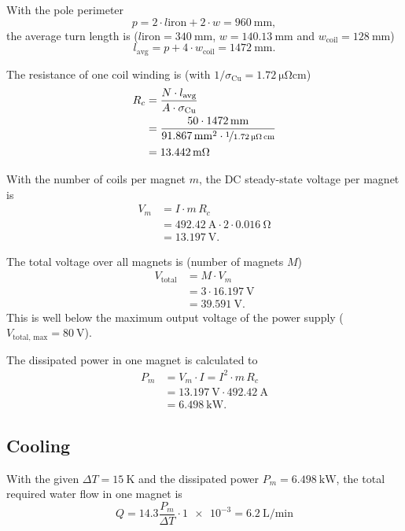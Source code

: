 \documentclass[10pt,a4paper,noendnumber=true]{scrartcl}
\begin{document}
With the pole perimeter
\begin{equation}
	p = 2 \cdot l\text{iron} + 2 \cdot w = \SI{960}{\mm},
\end{equation}
the average turn length is ($l\text{iron} = \SI{340}{\mm}$, $w = \SI{140.13}{\mm}$ and $w_\text{coil} = \SI{128}{\mm}$)
\begin{equation}
    l_\text{avg}= p + 4 \cdot w_\text{coil} = \SI{1472}{\mm}.
\end{equation}

The resistance of one coil winding is (with $1/\sigma_\text{Cu}=\SI{1.72}{\micro\ohm\cm}$)
\begin{align}
R_c&=\frac{N\cdot l_\text{avg}}{A\cdot\sigma_\text{Cu}} \\
&= \frac{50 \cdot \SI{1472}{\mm}}{\SI{91.867}{\mm\squared}\cdot \nicefrac{1}{\SI{1.72}{\micro\ohm\cm}}} \nonumber\\
&= \SI{13.442}{\milli\ohm} \nonumber
\end{align}

With the number of coils per magnet $m$, the DC steady-state voltage per magnet is
\begin{align}
V_m &= I \cdot m\,R_c \\
&= \SI{492.42}{\ampere} \cdot 2 \cdot \SI{0.016}{\ohm} \nonumber\\
&= \SI{13.197}{\volt}.\nonumber
\end{align}

The total voltage over all magnets is (number of magnets $M$)
\begin{align}
V_\text{total} &= M \cdot V_m \\
&= 3 \cdot \SI{16.197}{\volt} \nonumber\\
&= \SI{39.591}{\volt}.\nonumber
\end{align}
This is well below the maximum output voltage of the power supply ($V_\text{total, max}=\SI{80}{\volt}$).

The dissipated power in one magnet is calculated to
\begin{align}
P_m &= V_m \cdot I = I^2 \cdot m\,R_c \\
&= \SI{13.197}{\volt} \cdot \SI{492.42}{\ampere} \nonumber\\
&= \SI{6.498}{\kilo\watt}.\nonumber
\end{align}

\subsection{Cooling}
With the given $\Delta T=\SI{15}{\kelvin}$ and the dissipated power $P_m=\SI{6.498}{\kilo\watt}$, the total required water flow in one magnet is
\begin{equation}
    Q = 14.3 \frac{P_m}{\Delta T} \cdot \num{1e-3} = \SI{6.2}{\liter\per\minute}
\end{equation}
\end{document}

